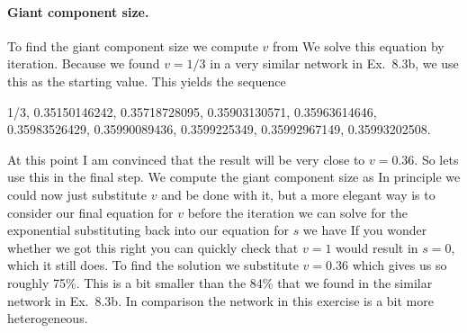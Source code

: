 \paragraph{Giant component size.}To find the giant component size we compute $v$ from 
We solve this equation by iteration. Because we found $v=1/3$ in a very similar network in Ex.~8.3b, we use this as the starting value. This yields the sequence 
\begin{center}
    1/3, 0.35150146242, 0.35718728095, 0.35903130571, 0.35963614646, 0.35983526429, 0.35990089436, 0.3599225349, 0.35992967149, 0.35993202508.      
\end{center}
At this point I am convinced that the result will be very close to $v=0.36$. So lets use this in the final step. We compute the giant component size as 
In principle we could now just substitute $v$ and be done with it, but a more elegant way is to consider our final equation for $v$ before the iteration
we can solve for the exponential 
substituting back into our equation for $s$ we have
If you wonder whether we got this right you can quickly check that $v=1$ would result in $s=0$, which it still does. To find the solution we substitute $v=0.36$ which gives us 
so roughly 75\%. This is a bit smaller than the 84\% that we found 
in the similar network in Ex.~8.3b. In comparison the network in this exercise is a bit more heterogeneous. 
